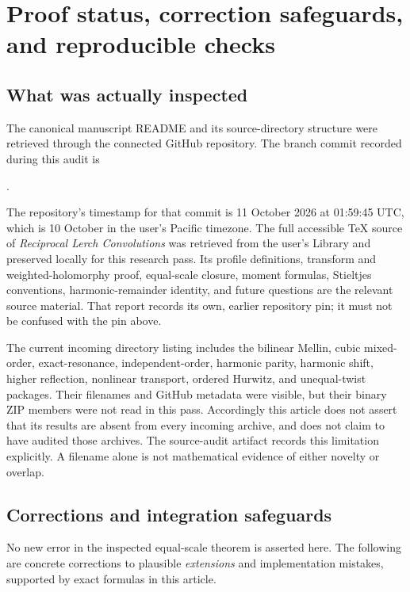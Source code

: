 \section{Proof status, correction safeguards, and reproducible checks}
\label{clc:sec:audit}

\subsection{What was actually inspected}
The canonical manuscript README and its source-directory structure were
retrieved through the connected GitHub repository. The branch commit
recorded during this audit is
\begin{center}\small
{}.
\end{center}
The repository's timestamp for that commit is 11 October 2026 at
01:59:45 UTC, which is 10 October in the user's Pacific timezone.
The full accessible TeX source of \emph{Reciprocal Lerch Convolutions}
was retrieved from the user's Library and preserved locally for this
research pass. Its profile definitions, transform and weighted-holomorphy
proof, equal-scale closure, moment formulas, Stieltjes conventions,
harmonic-remainder identity, and future questions are the relevant
source material. That report records its own, earlier repository pin;
it must not be confused with the pin above.

The current incoming directory listing includes the bilinear Mellin,
cubic mixed-order, exact-resonance, independent-order, harmonic parity,
harmonic shift, higher reflection, nonlinear transport, ordered Hurwitz,
and unequal-twist packages. Their filenames and GitHub metadata were
visible, but their binary ZIP members were not read in this pass.
Accordingly this article does not assert that its results are absent
from every incoming archive, and does not claim to have audited those
archives. The source-audit artifact records this limitation explicitly.
A filename alone is not mathematical evidence of either novelty or overlap.

\subsection{Corrections and integration safeguards}
No new error in the inspected equal-scale theorem is asserted here.
The following are concrete corrections to plausible \emph{extensions}
and implementation mistakes, supported by exact formulas in this article.

